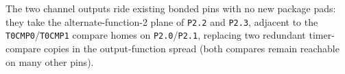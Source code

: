 The two channel outputs ride existing bonded pins with no new package pads: they take the alternate-function-2 plane of \texttt{P2.2} and \texttt{P2.3}, adjacent to the \texttt{T0CMP0}/\texttt{T0CMP1} compare homes on \texttt{P2.0}/\texttt{P2.1}, replacing two redundant timer-compare copies in the output-function spread (both compares remain reachable on many other pins).
